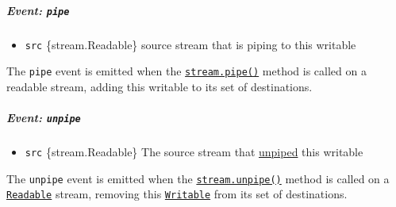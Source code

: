\subparagraph{\texorpdfstring{Event:
\texttt{\textquotesingle{}pipe\textquotesingle{}}}{Event: \textquotesingle pipe\textquotesingle{}}}\label{event-pipe}

\begin{itemize}
\tightlist
\item
  \texttt{src} \{stream.Readable\} source stream that is piping to this
  writable
\end{itemize}

The \texttt{\textquotesingle{}pipe\textquotesingle{}} event is emitted
when the
\hyperref[readablepipedestination-options]{\texttt{stream.pipe()}}
method is called on a readable stream, adding this writable to its set
of destinations.

\begin{Shaded}
\begin{Highlighting}[]
\OperatorTok{=} \NormalTok{()}\OperatorTok{;}
\OperatorTok{=} \NormalTok{()}\OperatorTok{;}
\NormalTok{(}\OperatorTok{,}\KeywordTok{=\textgreater{}}\NormalTok{ \{}
  \NormalTok{(}\NormalTok{)}\OperatorTok{;}
\OperatorTok{,}\OperatorTok{;}
\NormalTok{\})}\OperatorTok{;}
\OperatorTok{;}
\end{Highlighting}
\end{Shaded}

\subparagraph{\texorpdfstring{Event:
\texttt{\textquotesingle{}unpipe\textquotesingle{}}}{Event: \textquotesingle unpipe\textquotesingle{}}}\label{event-unpipe}

\begin{itemize}
\tightlist
\item
  \texttt{src} \{stream.Readable\} The source stream that
  \hyperref[readableunpipedestination]{unpiped} this writable
\end{itemize}

The \texttt{\textquotesingle{}unpipe\textquotesingle{}} event is emitted
when the \hyperref[readableunpipedestination]{\texttt{stream.unpipe()}}
method is called on a \hyperref[class-streamreadable]{\texttt{Readable}}
stream, removing this \hyperref[class-streamwritable]{\texttt{Writable}}
from its set of destinations.

